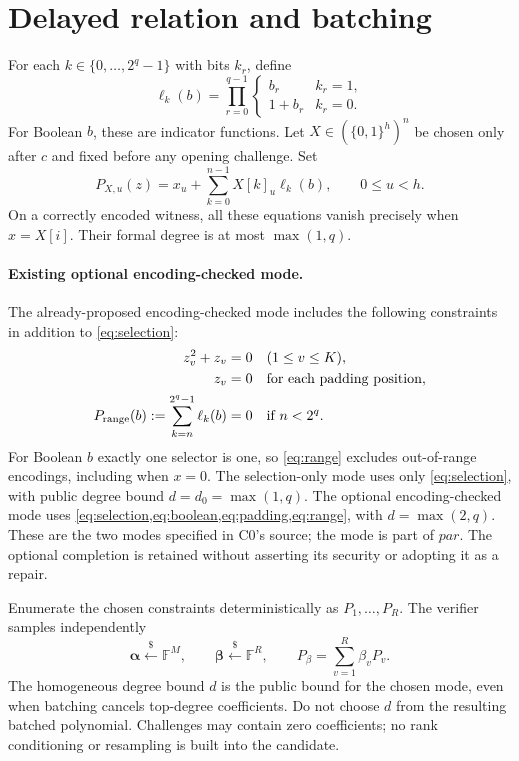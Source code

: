 \documentclass[11pt]{article}
\theoremstyle{plain}
\theoremstyle{definition}
\theoremstyle{remark}
\newcommand{\bits}{\{0,1\}}
\newcommand{\getsr}{\mathrel{\overset{\$}{\leftarrow}}}
\newcommand{\F}{\mathbb F}
\begin{document}
\section{Delayed relation and batching}\label{sec:relation}
For each $k\in\{0,\ldots,2^q-1\}$ with bits $k_r$, define
\begin{equation}
 \ell_k(b)=\prod_{r=0}^{q-1}
 \begin{cases}b_r&k_r=1,\\1+b_r&k_r=0.\end{cases}
\end{equation}
For Boolean $b$, these are indicator functions. Let $X\in(\bits^h)^n$ be
chosen only after $c$ and fixed before any opening challenge. Set
\begin{equation}\label{eq:selection}
 P_{X,u}(z)=x_u+\sum_{k=0}^{n-1}X[k]_u\ell_k(b),
 \qquad 0\leq u<h.
\end{equation}
On a correctly encoded witness, all these equations vanish precisely when
$x=X[i]$. Their formal degree is at most $\max(1,q)$.

\paragraph{Existing optional encoding-checked mode.}
The already-proposed encoding-checked mode includes the following constraints
in addition to \cref{eq:selection}:
\begin{align}
 z_v^2+z_v&=0 &&(1\leq v\leq K),\label{eq:boolean}\\
 z_v&=0 &&\text{for each padding position},\label{eq:padding}\\
 P_{\rm range}(b):=\sum_{k=n}^{2^q-1}\ell_k(b)&=0
 &&\text{if }n<2^q.\label{eq:range}
\end{align}
For Boolean $b$ exactly one selector is one, so \cref{eq:range} excludes
out-of-range encodings, including when $x=0$.
The selection-only mode uses only \cref{eq:selection}, with public degree
bound $d=d_0=\max(1,q)$. The optional encoding-checked mode uses
\cref{eq:selection,eq:boolean,eq:padding,eq:range}, with $d=\max(2,q)$.
These are the two modes specified in C0's source; the mode is part of $par$.
The optional completion is retained without asserting its security or
adopting it as a repair.

Enumerate the chosen constraints deterministically as $P_1,\ldots,P_R$.
The verifier samples independently
\begin{equation}\label{eq:challenges}
 \boldsymbol\alpha\getsr\F^M,\qquad
 \boldsymbol\beta\getsr\F^R,
 \qquad P_\beta=\sum_{v=1}^R\beta_vP_v.
\end{equation}
The homogeneous degree bound $d$ is the public bound for the chosen mode,
even when batching cancels top-degree coefficients. Do not choose $d$ from
the resulting batched polynomial. Challenges may contain zero coefficients;
no rank conditioning or resampling is built into the candidate.
\end{document}
